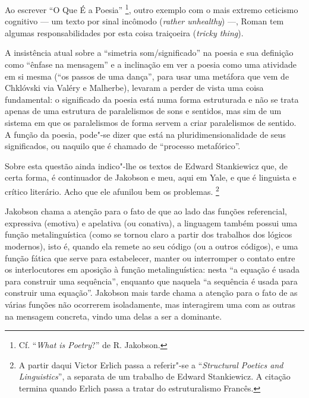 Ao escrever ``O Que É a Poesia'' \footnote{Cf. ``\emph{What is
  Poetry}?'' de R. Jakobson.}, outro exemplo com o mais extremo
ceticismo cognitivo --- um texto por sinal incômodo (\emph{rather
unhealthy}) ---, Roman tem algumas responsabilidades por esta coisa
traiçoeira (\emph{tricky thing}).

A insistência atual sobre a ``simetria som/significado'' na poesia e sua
definição como ``ênfase na mensagem'' e a inclinação em ver a poesia
como uma atividade em si mesma (``os passos de uma dança'', para usar
uma metáfora que vem de Chklóvski via Valéry e Malherbe), levaram a
perder de vista uma coisa fundamental: o significado da poesia está numa
forma estruturada e não se trata apenas de uma estrutura de paralelismos
de sons e sentidos, mas sim de um sistema em que os paralelismos de
forma servem a criar paralelismos de sentido. A função da poesia,
pode"-se dizer que está na pluridimensionalidade de seus significados, ou
naquilo que é chamado de ``processo metafórico''.

Sobre esta questão ainda indico"-lhe os textos de Edward Stankiewicz que,
de certa forma, é continuador de Jakobson e meu, aqui em Yale, e que é
linguista e crítico literário. Acho que ele afunilou bem os problemas.
\footnote{A partir daqui Victor Erlich passa a referir"-se a
  ``\emph{Structural Poetics and Linguistics}'', a separata de um
  trabalho de Edward Stankiewicz. A citação termina quando Erlich passa
  a tratar do estruturalismo Francês.}

Jakobson chama a atenção para o fato de que ao lado das funções
referencial, expressiva (emotiva) e apelativa (ou conativa), a linguagem
também possui uma função metalinguística (como se tornou claro a partir
dos trabalhos dos lógicos modernos), isto é, quando ela remete ao seu
código (ou a outros códigos), e uma função fática que serve para
estabelecer, manter ou interromper o contato entre os interlocutores em
aposição à função metalinguística: nesta ``a equação é usada para
construir uma sequência'', enquanto que naquela ``a sequência é usada
para construir uma equação''. Jakobson mais tarde chama a atenção para o
fato de as várias funções não ocorrerem isoladamente, mas interagirem
uma com as outras na mensagem concreta, vindo uma delas a ser a
dominante.


